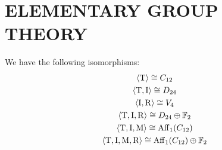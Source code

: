 \section{ELEMENTARY GROUP THEORY}


\begin{proposition}
	\cite[127]{FripertingerLackner2015}
	We have the following isomorphisms:
	\begin{gather}
		\langle \operatorname{T} \rangle \cong C_{12} \\
		\langle \operatorname{T}, \operatorname{I} \rangle \cong D_{24} \\
		\langle \operatorname{I}, \operatorname{R} \rangle \cong V_4 \\
		\langle \operatorname{T}, \operatorname{I}, \operatorname{R} \rangle \cong D_{24} \oplus \mathbb{F}_2 \\
		\langle \operatorname{T}, \operatorname{I}, \operatorname{M} \rangle \cong \operatorname{Aff}_1(C_{12}) \\
		\langle \operatorname{T}, \operatorname{I}, \operatorname{M}, \operatorname{R} \rangle \cong \operatorname{Aff}_1(C_{12}) \oplus \mathbb{F}_2
	\end{gather}
\end{proposition}
